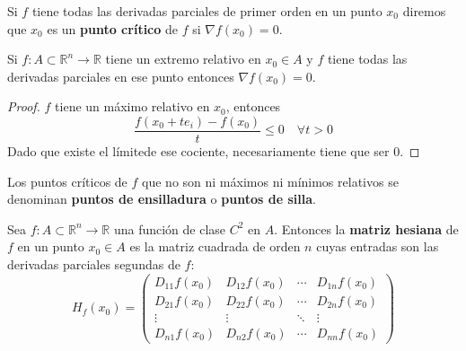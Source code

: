 \begin{definición}
    Si $f$ tiene todas las derivadas parciales de primer orden en un punto $x_0$ diremos que $x_0$ es un \textbf{punto crítico} de $f$ si $\nabla f(x_0) = 0$.
\end{definición}


\begin{teorema}
    Si $f: A \subset \mathbb{R}^n \to \mathbb{R}$ tiene un extremo relativo en $x_0 \in A$ y $f$ tiene todas las derivadas parciales en ese punto entonces $\nabla f(x_0) = 0$.
\end{teorema}
\begin{proof}
    $f$ tiene un máximo relativo en $x_0$, entonces
    $$\frac{f(x_0 +t e_i) - f(x_0)}{t} \leq 0 \quad \forall t > 0$$
    Dado que existe el límitede ese cociente, necesariamente tiene que ser 0. 
\end{proof}
\begin{definición}
    Los puntos críticos de $f$ que no son ni máximos ni mínimos relativos se denominan \textbf{puntos de ensilladura} o \textbf{puntos de silla}. 
\end{definición}
\begin{definición}
    Sea $f: A \subset \mathbb{R}^n \to \mathbb{R}$ una función de clase $C^2$ en $A$. Entonces la \textbf{matriz hesiana} de $f$ en un punto $x_0 \in A$ es la matriz cuadrada de orden $n$ cuyas entradas son las derivadas parciales segundas de $f$:
    $$H_f(x_0) = \begin{pmatrix}
        D_{11}f(x_0) & D_{12}f(x_0) & \cdots & D_{1n}f(x_0)\\
        D_{21}f(x_0) & D_{22}f(x_0) & \cdots & D_{2n}f(x_0)\\
        \vdots & \vdots & \ddots & \vdots\\
        D_{n1}f(x_0) & D_{n2}f(x_0) & \cdots & D_{nn}f(x_0)
    \end{pmatrix}$$
\end{definición}

